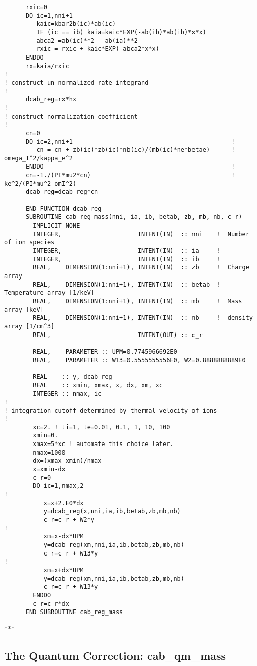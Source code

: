 \documentclass[preprint,12pt,eqsecnum,nofootinbib,amsmath,amssymb]{revtex4}
\begin{document}
{{{{{{\begin{verbatim}
      rxic=0
      DO ic=1,nni+1
         kaic=kbar2b(ic)*ab(ic)
         IF (ic == ib) kaia=kaic*EXP(-ab(ib)*ab(ib)*x*x)
         abca2 =ab(ic)**2 - ab(ia)**2
         rxic = rxic + kaic*EXP(-abca2*x*x)
      ENDDO
      rx=kaia/rxic
!
! construct un-normalized rate integrand
!
      dcab_reg=rx*hx
!
! construct normalization coefficient
!
      cn=0
      DO ic=2,nni+1                                            !
         cn = cn + zb(ic)*zb(ic)*nb(ic)/(mb(ic)*ne*betae)      ! omega_I^2/kappa_e^2
      ENDDO                                                    ! 
      cn=-1./(PI*mu2*cn)                                       ! ke^2/(PI*mu^2 omI^2)
      dcab_reg=dcab_reg*cn 

      END FUNCTION dcab_reg 
      SUBROUTINE cab_reg_mass(nni, ia, ib, betab, zb, mb, nb, c_r)
        IMPLICIT NONE
        INTEGER,                     INTENT(IN)  :: nni    !  Number of ion species
        INTEGER,                     INTENT(IN)  :: ia     !
        INTEGER,                     INTENT(IN)  :: ib     !
        REAL,    DIMENSION(1:nni+1), INTENT(IN)  :: zb     !  Charge array
        REAL,    DIMENSION(1:nni+1), INTENT(IN)  :: betab  !  Temperature array [1/keV]
        REAL,    DIMENSION(1:nni+1), INTENT(IN)  :: mb     !  Mass array [keV]
        REAL,    DIMENSION(1:nni+1), INTENT(IN)  :: nb     !  density array [1/cm^3]
        REAL,                        INTENT(OUT) :: c_r

        REAL,    PARAMETER :: UPM=0.7745966692E0
        REAL,    PARAMETER :: W13=0.5555555556E0, W2=0.8888888889E0

        REAL    :: y, dcab_reg
        REAL    :: xmin, xmax, x, dx, xm, xc
        INTEGER :: nmax, ic
!
! integration cutoff determined by thermal velocity of ions
!
        xc=2. ! ti=1, te=0.01, 0.1, 1, 10, 100
        xmin=0.
        xmax=5*xc ! automate this choice later.
        nmax=1000
        dx=(xmax-xmin)/nmax 
        x=xmin-dx
        c_r=0
        DO ic=1,nmax,2
!     
           x=x+2.E0*dx
           y=dcab_reg(x,nni,ia,ib,betab,zb,mb,nb)
           c_r=c_r + W2*y
!
           xm=x-dx*UPM
           y=dcab_reg(xm,nni,ia,ib,betab,zb,mb,nb)
           c_r=c_r + W13*y
!
           xm=x+dx*UPM
           y=dcab_reg(xm,nni,ia,ib,betab,zb,mb,nb)
           c_r=c_r + W13*y
        ENDDO
        c_r=c_r*dx
      END SUBROUTINE cab_reg_mass
\end{verbatim}


***===

\subsection{The Quantum Correction: cab\_qm\_mass}

}}}}}}
\end{document}
